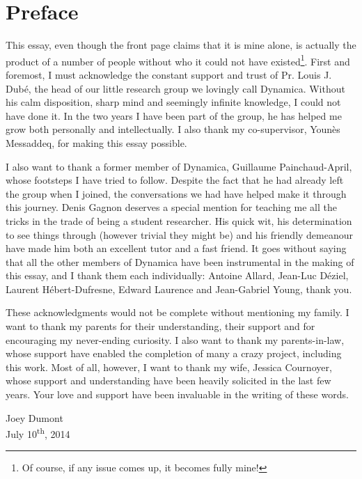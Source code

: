 \chapter*{Preface}
\renewcommand*{\thefootnote}{\fnsymbol{footnote}}
This essay, even though the front page claims that it is mine alone, 
is actually the product of a number of people without who it
could not have existed\footnote{Of course, if any issue comes up, 
it becomes fully mine!}. First and foremost, I must acknowledge
the constant support and trust of Pr. Louis J. Dubé, the head
of our little research group we lovingly call Dynamica. Without his calm
disposition, sharp mind and seemingly infinite knowledge, I could not have done it.
In the two years I have been part of the group, he has helped
me grow both personally and intellectually. I also thank my 
co-supervisor, Younès Messaddeq, for making this essay possible.

I also want to thank a former member of Dynamica, 
Guillaume Painchaud-April, whose footsteps I have
tried to follow. Despite the fact that he had already left
the group when I joined, the conversations we had have helped
make it through this journey. Denis Gagnon deserves a special mention
for teaching me all the tricks in the trade of being a student
researcher. His quick wit, his determination to see things through
(however trivial they might be) 
and  his friendly demeanour have made him both an excellent tutor 
and a fast friend. It goes without saying that all the other
members of Dynamica have been instrumental in the making 
of this essay, and I thank them each individually: Antoine 
Allard, Jean-Luc Déziel, Laurent Hébert-Dufresne, Edward
Laurence and Jean-Gabriel Young, thank you. 

These acknowledgments would not be complete without
mentioning my family. I want to thank my parents 
for their understanding, their support and for 
encouraging my never-ending curiosity. I also 
want to thank my parents-in-law, whose support 
have enabled the completion of many a crazy project, 
including this work. Most of all, however, I want to 
thank my wife, Jessica Cournoyer, whose support and 
understanding have been heavily solicited in the last few years. 
Your love and support have been invaluable in the writing of these words. 

\begin{flushright}
Joey Dumont\\
July 10\textsuperscript{th}, 2014
\end{flushright}